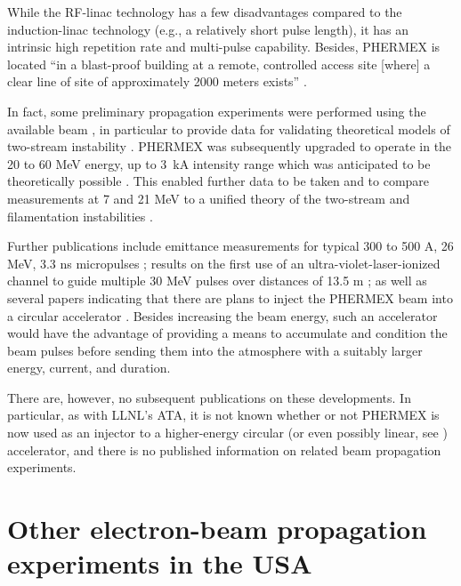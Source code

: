 \documentclass [12pt,a4paper,     ]{report} %
\begin{document}
While the RF-linac technology has a few disadvantages compared to the induction-linac technology (e.g., a relatively short pulse length), it has an intrinsic high repetition rate and multi-pulse capability.  Besides, PHERMEX is located ``in a blast-proof building at a remote, controlled access site [where] a clear line of site of approximately 2000 meters exists'' \cite[p.2]{MOIR-1981-}.

In fact, some preliminary propagation experiments were performed using the available beam \cite{MOIR-1980-}, in particular to provide data \cite{MOIR-1981-} for validating theoretical models of two-stream instability \cite{NEWBE1982-}.  PHERMEX was subsequently upgraded to operate in the 20 to 60 MeV energy, up to 3~kA intensity range which was anticipated to be theoretically possible \cite{MOIR-1981-, STARK1983-}.   This enabled further data to be taken and to compare measurements at 7 and 21 MeV to a unified theory of the two-stream and filamentation instabilities \cite{LEE--1983B}.

Further publications include emittance measurements for typical 300 to 500 A, 26 MeV, 3.3 ns micropulses \cite{MOIR-1985A}; results on the first use of an ultra-violet-laser-ionized channel to guide multiple 30 MeV pulses over distances of 13.5 m \cite{CARLS1987-}; as well as several papers indicating that there are plans to inject the PHERMEX beam into a circular accelerator \cite{MOIR-1985B, GISLE1987-, PETIL1987-}. Besides increasing the beam energy, such an accelerator would have the advantage of providing a means to accumulate and condition the beam pulses before sending them into the atmosphere with a suitably larger energy, current, and duration.

There are, however, no subsequent publications on these developments.  In particular, as with LLNL's ATA, it is not known whether or not PHERMEX is now used as an injector to a higher-energy circular (or even possibly linear, see \cite[p.2]{FAHEL1982-}) accelerator, and there is no published information on related beam propagation experiments.



\section{Other electron-beam propagation experiments in the USA}
\label{usa:0}
\end{document}

